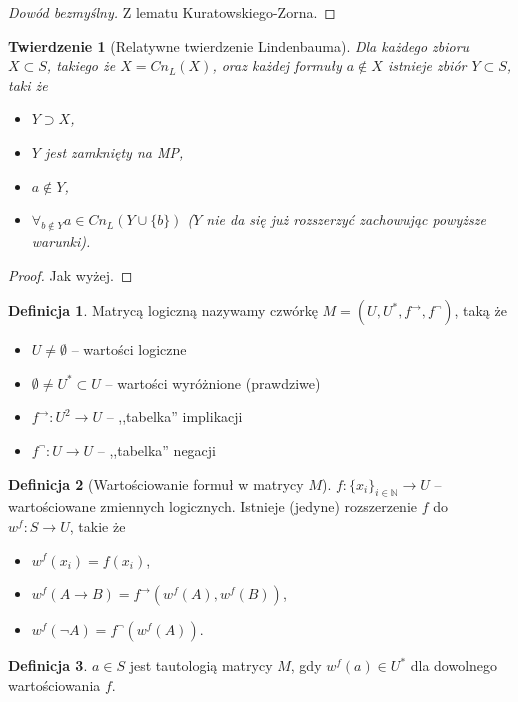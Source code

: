 \documentclass[10pt,a4paper]{article}
\theoremstyle{plain}
\newtheorem{theorem}{Twierdzenie}
\theoremstyle{definition}
\newtheorem*{definition}{Definicja}
\newcommand{\impl}{\rightarrow}
\newcommand{\N}{\mathbb{N}}
\begin{document}
\begin{proof}[Dowód bezmyślny]Z lematu Kuratowskiego-Zorna.\end{proof}

\begin{theorem}[Relatywne twierdzenie Lindenbauma]

Dla każdego zbioru $X \subset S$, takiego że $X = Cn_L(X)$, oraz każdej
formuły $a \not \in X$ istnieje zbiór $Y \subset S$, taki że
\begin{itemize}
  \item $Y \supset X$,
  \item $Y$ jest zamknięty na MP,
  \item $a \not \in Y$,
  \item $\forall_{b \not \in Y} a \in Cn_L(Y \cup \{b\})$ 
    ($Y$ nie da się już rozszerzyć zachowując powyższe warunki).
\end{itemize}
\end{theorem}

\begin{proof}Jak wyżej.\end{proof}

\begin{definition}
Matrycą logiczną nazywamy czwórkę $M=(U, U^*, f^\impl, f^\neg)$, taką że
\begin{itemize}
  \item $U \neq \emptyset$ -- wartości logiczne
  \item $\emptyset \neq U^* \subset U$ -- wartości wyróżnione (prawdziwe)
  \item $f^\impl : U^2 \to U$ -- ,,tabelka'' implikacji
  \item $f^\neg : U \to U$ -- ,,tabelka'' negacji
\end{itemize}
\end{definition}

\begin{definition}[Wartościowanie formuł w matrycy $M$]
$f : \{x_i\}_{i\in\N} \to U$ -- wartościowane zmiennych logicznych.
Istnieje (jedyne) rozszerzenie $f$ do $w^f : S \to U$, takie że
\begin{itemize}
  \item $w^f(x_i) = f(x_i)$,
  \item $w^f(A \impl B) = f^\impl(w^f(A), w^f(B))$,
  \item $w^f(\neg A) = f^\neg(w^f(A))$.
\end{itemize}
\end{definition}

\begin{definition}
$a \in S$ jest tautologią matrycy $M$, gdy $w^f(a) \in U^*$ dla dowolnego
wartościowania $f$.
\end{definition}
\end{document}
